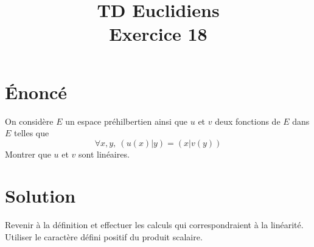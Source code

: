 \documentclass[french]{article}
\title{TD Euclidiens\\ Exercice 18}
\date{}
\begin{document}
\maketitle

\section{Énoncé}
On considère $E$ un espace préhilbertien ainsi que $u$ et $v$ deux fonctions de $E$ dans $E$ telles que $$\forall x,y,\ (u(x)|y)=(x|v(y))$$ Montrer que $u$ et $v$ sont linéaires.
\section{Solution}
Revenir à la définition et effectuer les calculs qui correspondraient à la linéarité. Utiliser le caractère défini positif du produit scalaire.
\end{document}
